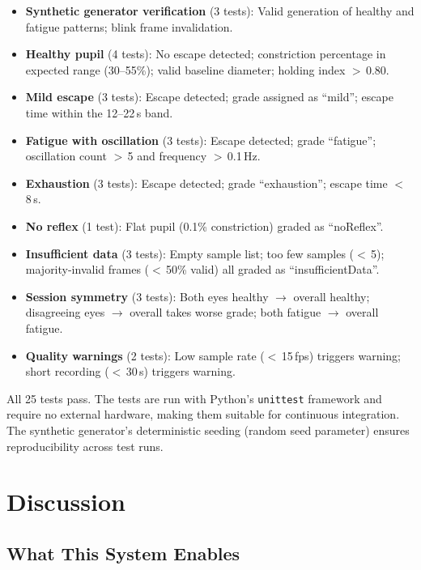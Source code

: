 \documentclass[11pt]{article}
\begin{document}
\begin{itemize}
  \item \textbf{Synthetic generator verification} (3 tests): Valid generation
        of healthy and fatigue patterns; blink frame invalidation.
  \item \textbf{Healthy pupil} (4 tests): No escape detected; constriction
        percentage in expected range (30--55\%); valid baseline diameter;
        holding index $>$\,0.80.
  \item \textbf{Mild escape} (3 tests): Escape detected; grade assigned as
        ``mild''; escape time within the 12--22\,s band.
  \item \textbf{Fatigue with oscillation} (3 tests): Escape detected; grade
        ``fatigue''; oscillation count $>$\,5 and frequency $>$\,0.1\,Hz.
  \item \textbf{Exhaustion} (3 tests): Escape detected; grade
        ``exhaustion''; escape time $<$\,8\,s.
  \item \textbf{No reflex} (1 test): Flat pupil (0.1\% constriction) graded
        as ``noReflex''.
  \item \textbf{Insufficient data} (3 tests): Empty sample list; too few
        samples ($<$\,5); majority-invalid frames ($<$\,50\% valid) all
        graded as ``insufficientData''.
  \item \textbf{Session symmetry} (3 tests): Both eyes healthy $\rightarrow$
        overall healthy; disagreeing eyes $\rightarrow$ overall takes worse
        grade; both fatigue $\rightarrow$ overall fatigue.
  \item \textbf{Quality warnings} (2 tests): Low sample rate ($<$\,15\,fps)
        triggers warning; short recording ($<$\,30\,s) triggers warning.
\end{itemize}

All 25 tests pass. The tests are run with Python's \texttt{unittest} framework
and require no external hardware, making them suitable for continuous
integration. The synthetic generator's deterministic seeding (random seed
parameter) ensures reproducibility across test runs.

\section{Discussion}

\subsection{What This System Enables}
\end{document}

